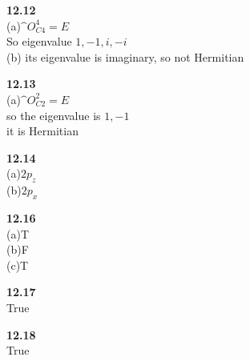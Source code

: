 \documentclass{article}
\begin{document}
\textbf{12.12}\\
(a)$\^{O}_{C4}^4 = E$\\
So eigenvalue $1,-1,i,-i$\\
(b) its eigenvalue is imaginary, so not Hermitian\\
\newline

\textbf{12.13}\\
(a)$\^{O}_{C2}^2 = E$\\
so the eigenvalue is $1,-1$\\
it is Hermitian\\
\newline

\textbf{12.14}\\
(a)$2p_z$\\
(b)$2p_x$\\
\newline

\textbf{12.16}\\
(a)T\\
(b)F\\
(c)T\\
\newline

\textbf{12.17}\\
True\\
\newline

\textbf{12.18}\\
True\\
\newline
\end{document}
